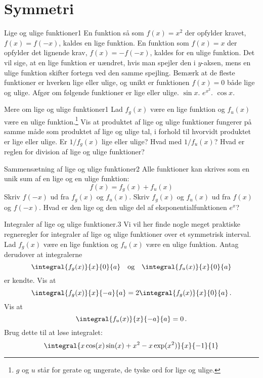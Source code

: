 \newpage
\section*{Symmetri}
\begin{opgave}{Lige og ulige funktioner}{1}
En funktion så som $f(x) = x^2$ der opfylder kravet, $f(x) = f(-x)$, kaldes en lige funktion. En funktion som $f(x) = x$ der opfylder det lignende krav, $f(x)=-f(-x)$, kaldes for en ulige funktion.
Det vil sige, at en lige funktion er uændret, hvis man spejler den i $y$-aksen, mens en ulige funktion skifter fortegn ved den samme spejling.
Bemærk at de fleste funktioner er hverken lige eller ulige, og unikt er funktionen $f(x) = 0$ både lige og ulige.
Afgør om følgende funktioner er lige eller ulige.
\opg $\sin x$.
\opg $e^{x^2}$.
\opg $\cos x$.
\end{opgave}
%
\begin{opgave}{Mere om lige og ulige funktioner}{1}
Lad $f_g(x)$ være en lige funktion og $f_u(x)$ være en ulige funktion.\footnote{$g$ og $u$ står for gerate og ungerate, de tyske ord for lige og ulige.}
\opg Vis at produktet af lige og ulige funktioner fungerer på samme måde som produktet af lige og ulige tal, i forhold til hvorvidt produktet er lige eller ulige.
\opg Er $1/f_{g}(x)$ lige eller ulige?
\opg Hvad med $1/f_{u}(x)$?
\opg Hvad er reglen for division af lige og ulige funktioner?
\end{opgave}
\begin{opgave}{Sammensætning af lige og ulige funktioner}{2}
Alle funktioner kan skrives som en unik sum af en lige og en ulige funktion:
$$
f(x) = f_g(x)+f_u(x)
$$
\opg Skriv $f(-x)$ ud fra $f_g(x)$ og $f_u(x)$.
\opg Skriv $f_g(x)$ og $f_u(x)$ ud fra $f(x)$ og $f(-x)$.
\opg Hvad er den lige og den ulige del af eksponentialfunktionen $e^x$?
\end{opgave}
%
\begin{opgave}{Integraler af lige og ulige funktioner.}{3}
Vi vil her finde nogle meget praktiske regneregler for integraler af lige og ulige funktioner over et symmetrisk interval.
Lad $f_g(x)$ være en lige funktion og $f_u(x)$ være en ulige funktion.
Antag derudover at integralerne
$$
\integral{f_g(x)}{x}{0}{a}   \quad \text{og} \quad \integral{f_u(x)}{x}{0}{a} 
$$
er kendte.
\opg Vis at
$$
\integral{f_g(x)}{x}{-a}{a} = 2\integral{f_g(x)}{x}{0}{a} \, .
$$
\opg Vis at
$$\integral{f_u(x)}{x}{-a}{a} = 0 \, .
$$
\opg Brug dette til at løse integralet: $$\integral{x\cos(x)\sin(x)+x^2-x\exp(x^2)}{x}{-1}{1}$$
\end{opgave}